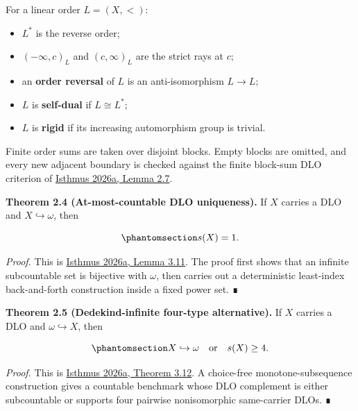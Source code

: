 \documentclass[
  english,
  11pt,
  reqno]{amsart}
\providecommand{\tightlist}{%
  \setlength{\itemsep}{0pt}\setlength{\parskip}{0pt}}
\begin{document}
For a linear order \(L=(X,<)\):

\begin{itemize}
\tightlist
\item
  \(L^*\) is the reverse order;
\item
  \((-\infty,c)_L\) and \((c,\infty)_L\) are the strict rays at \(c\);
\item
  an \textbf{order reversal} of \(L\) is an anti-isomorphism \(L\to L\);
\item
  \(L\) is \textbf{self-dual} if \(L\cong L^*\);
\item
  \(L\) is \textbf{rigid} if its increasing automorphism group is
  trivial.
\end{itemize}

Finite order sums are taken over disjoint blocks. Empty blocks are
omitted, and every new adjacent boundary is checked against the finite
block-sum DLO criterion of \hyperref[ref:isthmus2026a]{Isthmus 2026a,
Lemma 2.7}.

\protect{}\label{thm:2-4-subcountable-uniqueness}

\textbf{Theorem 2.4 (At-most-countable DLO uniqueness).} If \(X\)
carries a DLO and \(X\hookrightarrow\omega\), then

\begin{equation}\protect\phantomsection\label{eq:subcountable-uniqueness}{
s(X)=1.
}\end{equation}

\emph{Proof.} This is \hyperref[ref:isthmus2026a]{Isthmus 2026a, Lemma
3.11}. The proof first shows that an infinite subcountable set is
bijective with \(\omega\), then carries out a deterministic least-index
back-and-forth construction inside a fixed power set. ∎

\protect{}\label{thm:2-5-dedekind-alternative}

\textbf{Theorem 2.5 (Dedekind-infinite four-type alternative).} If \(X\)
carries a DLO and \(\omega\hookrightarrow X\), then

\begin{equation}\protect\phantomsection\label{eq:dedekind-alternative}{
X\hookrightarrow\omega
\quad\text{or}\quad
s(X)\ge4.
}\end{equation}

\emph{Proof.} This is \hyperref[ref:isthmus2026a]{Isthmus 2026a, Theorem
3.12}. A choice-free monotone-subsequence construction gives a countable
benchmark whose DLO complement is either subcountable or supports four
pairwise nonisomorphic same-carrier DLOs. ∎
\end{document}
